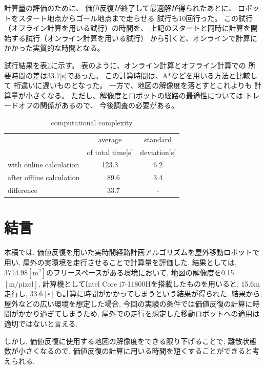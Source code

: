 \documentclass{jarticle}
\begin{document}
計算量の評価のために、
価値反復が終了して最適解が得られたあとに、
ロボットをスタート地点からゴール地点まで走らせる
試行も10回行った。
この試行（オフライン計算を用いる試行）の時間を、
上記のスタートと同時に計算を開始する試行（オンライン計算を用いる試行）
から引くと、オンラインで計算にかかった実質的な時間となる。

試行結果を表\ref{table:result}に示す。
表のように、オンライン計算とオフライン計算での
所要時間の差は$33.7$[s]であった。
この計算時間は、A*などを用いる方法と比較して
桁違いに遅いものとなった。
一方で、地図の解像度を落とすとこれよりも
計算量が小さくなる。
ただし、解像度とロボットの経路の最適性については
トレードオフの関係があるので、
今後調査の必要がある。



\begin{table}[hbtp]
	\caption{computational complexity}
	\label{table:result}
	\centering
	\begin{small}
	 \begin{tabular}{l|cc}
		\hline
		 & average & standard \\
		 & of total time[s] & deviation[s] \\
		\hline \hline
		with online calculation & 123.3 & 6.2 \\
		after offline calculation &\ \ 89.6 & 3.4 \\
		\hline
		 difference & \ \ 33.7 & - \\
		\hline
	 \end{tabular}
	\end{small}
 \end{table}

\section{結言}%
本稿では, 価値反復を用いた実時間経路計画アルゴリズムを屋外移動ロボットで用い, 屋外の実環境を走行させることで計算量を評価した. 
結果としては, 3714.98$\mathrm{[m^2]}$のフリースペースがある環境において, 
地図の解像度を0.15$\mathrm{[m/pixel]}$, 計算機としてIntel Core i7-11800Hを搭載したものを用いると, 
15.6$\mathrm{m}$走行し, 33.6$\mathrm{[s]}$も計算に時間がかかってしまうという結果が得られた. 
結果から, 屋外などの広い環境を想定した場合, 今回の実験の条件では価値反復の計算に時間がかかり過ぎてしまうため, 
屋外での走行を想定した移動ロボットへの適用は適切ではないと言える.

しかし, 価値反復に使用する地図の解像度をできる限り下げることで, 
離散状態数が小さくなるので, 価値反復の計算に用いる時間を短くすることができると考えられる.
\end{document}
